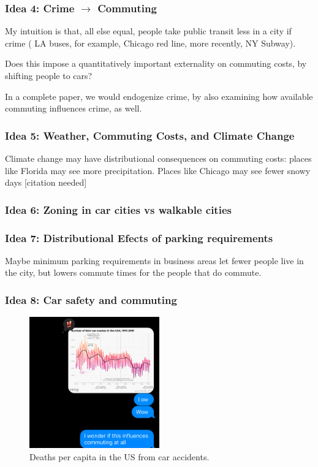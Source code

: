 \documentclass{article}
\begin{document}
\subsubsection{Idea 4: Crime $\rightarrow$ Commuting}
My intuition is that, all else equal, people take public transit less in a city if crime ( LA buses, for example, Chicago red line, more recently, NY Subway).

Does this impose a quantitatively important externality on commuting costs, by shifting people to cars?

In a complete paper, we would endogenize crime, by also examining how available commuting influences crime, as well. 

\subsubsection{Idea 5: Weather, Commuting Costs, and Climate Change}
Climate change may have distributional consequences on commuting costs:
places like Florida may see more precipitation. Places like Chicago may see fewer snowy days [citation needed]
\subsubsection{Idea 6: Zoning in car cities vs walkable cities}

\subsubsection{Idea 7: Distributional Efects of parking requirements}
Maybe minimum parking requirements in business areas let fewer people live in the city, but lowers commute times for the people that do commute.
\subsubsection{Idea 8: Car safety and commuting}
\begin{figure}
    \centering
    \includegraphics[width=0.5\textwidth]{img/cardeaths.jpeg}
    \caption{Deaths per capita in the US from car accidents.}
    \label{fig:car_deaths}
\end{figure}
\end{document}
